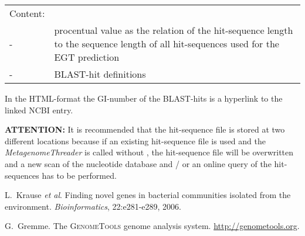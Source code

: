 \documentclass[12pt,titlepage]{article}
\newcommand{\MetagenomeThreader}{\textit{MetagenomeThreader}\xspace}
\newcommand{\Attention}{\textbf{ATTENTION:}\xspace}
\begin{document}
\begin{tabular}{p{}p{14cm}}
Content:
\\
- &procentual value as the relation of the hit-sequence length
to the sequence length of all hit-sequences used for the EGT prediction
\\
- &BLAST-hit definitions
\end{tabular}

In the HTML-format the GI-number of the BLAST-hits is a hyperlink to the
linked NCBI entry.

\Attention It is recommended that the hit-sequence file is stored at two
different locations because if an existing hit-sequence file is used and
the \MetagenomeThreader is called without  , the hit-sequence file
will be overwritten and a new scan of the nucleotide database and / or an online query of the
hit-sequences has to be performed.

%
%
\begin{thebibliography}{1}

L.~Krause \textit{et al}.
\newblock Finding novel genes in bacterial communities isolated
from the environment. \textit{Bioinformatics}, 22:e281-e289, 2006.

G.~Gremme.
\newblock The \textsc{GenomeTools} genome analysis system.
  \url{http://genometools.org}.

\end{thebibliography}
\end{document}

